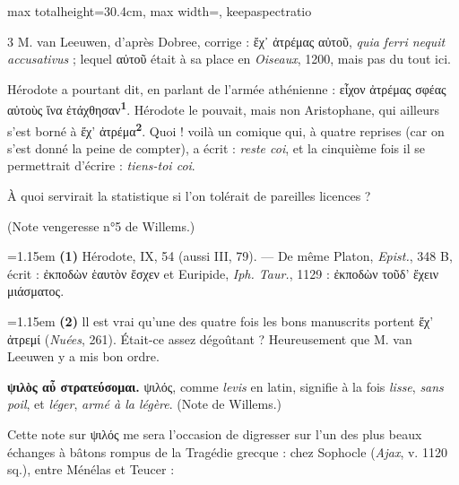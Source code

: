 \documentclass[11pt,twoside]{book}
\newcommand{\italique}[1]{\textit{#1}}
\newcommand{\marqueur}[1]{\textsuperscript{\color{rubricRed}\textbf{#1}}}
\begin{document}
\begin{adjustbox}{max totalheight=30.4cm, max width=\textwidth, keepaspectratio}
\begin{minipage}{\textwidth}
{\begin{multicols}{3}
\noindent M. van Leeuwen, d'après Dobree, corrige : ἔχ᾽ ἀτρέμας αὐτοῦ, \italique{quia ferri nequit accusativus} ; lequel αὐτοῦ était à sa place en \italique{Oiseaux}, 1200, mais pas du tout ici.
\par\vspace{1.5pt}
\noindent Hérodote a pourtant dit, en parlant de l'armée athénienne : εἶχον ἀτρέμας σφέας αὐτοὺς ἵνα ἐτάχθησαν\marqueur{1}. Hérodote le pouvait, mais non Aristophane, qui ailleurs s'est borné à ἔχ' ἀτρέμα\marqueur{2}. Quoi ! voilà un comique qui, à quatre reprises (car on s'est donné la peine de compter), a écrit : \italique{reste coi}, et la cinquième fois il se permettrait d'écrire : \italique{tiens-toi coi}.
\par\vspace{1.5pt}
\noindent À quoi servirait la statistique si l'on tolérait de pareilles licences ?
\par\vspace{1.5pt}
\noindent (Note vengeresse n°5 de Willems.)
\par\vspace{1.5pt}
\par\vspace{1.2pt}\par\nopagebreak\vspace{1pt}\noindent\hangindent=1.15em {\color{sepiaNote}\textbf{(1)}} Hérodote, IX, 54 (aussi III, 79). — De même Platon, \italique{Epist.}, 348 B, écrit : ἐκποδὼν ἑαυτὸν ἔσχεν et Euripide, \italique{Iph. Taur.}, 1129 : ἐκποδὼν τοῦδ' ἔχειν μιάσματος.
\par\vspace{1.5pt}
\noindent\hangindent=1.15em {\color{sepiaNote}\textbf{(2)}} ll est vrai qu'une des quatre fois les bons manuscrits portent ἔχ' ἀτρεμί (\italique{Nuées}, 261). Était-ce assez dégoûtant ? Heureusement que M. van Leeuwen y a mis bon ordre.
\par\vspace{1.5pt}
 \textbf{ψιλὸς αὖ στρατεύσομαι.} ψιλός, comme \italique{levis} en latin, signifie à la fois \italique{lisse}, \italique{sans poil}, et \italique{léger}, \italique{armé à la légère}. (Note de Willems.)\\
\par\vspace{1.5pt}
\noindent Cette note sur ψιλός me sera l'occasion de digresser sur l'un des plus beaux échanges à bâtons rompus de la Tragédie grecque : chez Sophocle (\italique{Ajax}, v. 1120 sq.), entre Ménélas et Teucer :

\end{multicols}}
\end{minipage}
\end{adjustbox}
\end{document}
